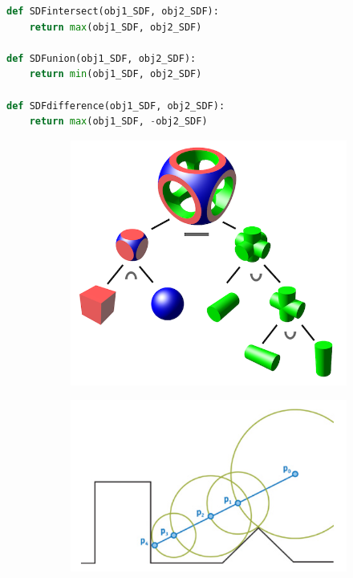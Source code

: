 \begin{lstlisting}[language=Python,caption=Code example showing how SDFs of simpler object can be combined together to gradually build a scene SDF., label=code:sdfs]
def SDFintersect(obj1_SDF, obj2_SDF):
    return max(obj1_SDF, obj2_SDF)

def SDFunion(obj1_SDF, obj2_SDF):
    return min(obj1_SDF, obj2_SDF)

def SDFdifference(obj1_SDF, obj2_SDF):
    return max(obj1_SDF, -obj2_SDF)
\end{lstlisting}

\begin{figure}
	\centering
	\begin{subfigure}{.5\textwidth}
		\centering
		\includegraphics[width=.9\textwidth]{../graphics/csg.png}\label{fig:csg}
	\end{subfigure}%
	\begin{subfigure}{.5\textwidth}
		\centering
		\includegraphics[width=.9\textwidth]{../graphics/marching.png} \label{fig:marching}

\end{subfigure}
\end{figure}
